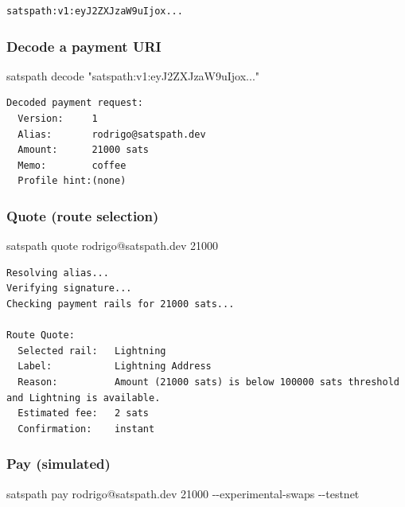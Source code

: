 \documentclass[
]{article}
\newenvironment{Shaded}{}{}
\newcommand{\AttributeTok}[1]{\textcolor[rgb]{0.49,0.56,0.16}{#1}}
\newcommand{\ExtensionTok}[1]{#1}
\newcommand{\NormalTok}[1]{#1}
\newcommand{\StringTok}[1]{\textcolor[rgb]{0.25,0.44,0.63}{#1}}
\begin{document}
\begin{verbatim}
satspath:v1:eyJ2ZXJzaW9uIjox...
\end{verbatim}

\hypertarget{decode-a-payment-uri}{%
\subsubsection{Decode a payment URI}\label{decode-a-payment-uri}}

\begin{Shaded}
\begin{Highlighting}[]
\ExtensionTok{satspath}\NormalTok{ decode }\StringTok{"satspath:v1:eyJ2ZXJzaW9uIjox..."}
\end{Highlighting}
\end{Shaded}

\begin{verbatim}
Decoded payment request:
  Version:     1
  Alias:       rodrigo@satspath.dev
  Amount:      21000 sats
  Memo:        coffee
  Profile hint:(none)
\end{verbatim}

\hypertarget{quote-route-selection}{%
\subsubsection{Quote (route selection)}\label{quote-route-selection}}

\begin{Shaded}
\begin{Highlighting}[]
\ExtensionTok{satspath}\NormalTok{ quote rodrigo@satspath.dev 21000}
\end{Highlighting}
\end{Shaded}

\begin{verbatim}
Resolving alias...
Verifying signature...
Checking payment rails for 21000 sats...

Route Quote:
  Selected rail:   Lightning
  Label:           Lightning Address
  Reason:          Amount (21000 sats) is below 100000 sats threshold and Lightning is available.
  Estimated fee:   2 sats
  Confirmation:    instant
\end{verbatim}

\hypertarget{pay-simulated}{%
\subsubsection{Pay (simulated)}\label{pay-simulated}}

\begin{Shaded}
\begin{Highlighting}[]
\ExtensionTok{satspath}\NormalTok{ pay rodrigo@satspath.dev 21000 }\AttributeTok{{-}{-}experimental{-}swaps} \AttributeTok{{-}{-}testnet}
\end{Highlighting}
\end{Shaded}
\end{document}
